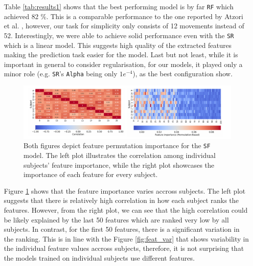 \documentclass[10pt]{article}
\begin{document}
Table \ref{tab:results1} shows that the best performing model is by far \texttt{RF} which achieved 82 \%.
This is a comparable performance to the one reported by Atzori et al. \cite{ninapro},
however, our task for simplicity only consists of 12 movements instead of 52. Interestingly,
we were able to achieve solid performance even with the \texttt{SR} which is a linear model.
This suggests high quality of the extracted features making the prediction task easier for the model.
Last but not least, while it is important in general to consider 
regularisation, for our models, it played only a minor role (e.g. \texttt{SR}'s \texttt{Alpha} being only $1e^{-4}$), as the best configuration show.


\begin{figure}[h]
    \centering
    \includegraphics[width=1\textwidth]{../figures/fig_feat_imp.pdf}
    \caption{Both figures depict feature permutation importance for the \texttt{SF} 
    model. The left plot illustrates the correlation among individual subjects' feature 
    importance, while the right plot showcases the importance of each feature for every subject.}
    \label{fig:feat_imp}
\end{figure}

Figure \ref{fig:feat_imp} shows that the feature importance varies accross subjects. The left plot
suggests that there is relatively high correlation in how each subject ranks the features. However,
from the right plot, we can see that the high correlation could be likely explained by the 
last 50 features which are ranked very low by all subjects. In contrast, for the first 
50 features, there is a significant variation in the ranking. This is in line 
with the Figure \ref{fig:feat_var} that shows variability in the individual feature values
accross subjects, therefore, it is not surprising that the models trained on individual subjects
use different features.


\newpage


\end{document}
